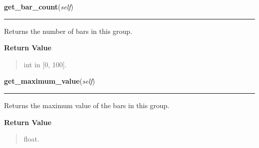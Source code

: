     \label{pygtk_chart:multi_bar_chart:BarGroup:get_bar_count}

    \vspace{0.5ex}

\hspace{.8\funcindent}\begin{boxedminipage}{\funcwidth}

    \raggedright \textbf{get\_bar\_count}(\textit{self})

    \vspace{-1.5ex}

    \rule{\textwidth}{0.5\fboxrule}
\setlength{\parskip}{2ex}
    Returns the number of bars in this group.

\setlength{\parskip}{1ex}
      \textbf{Return Value}
    \vspace{-1ex}

      \begin{quote}
      int in [0, 100].

      \end{quote}

    \end{boxedminipage}

    \label{pygtk_chart:multi_bar_chart:BarGroup:get_maximum_value}

    \vspace{0.5ex}

\hspace{.8\funcindent}\begin{boxedminipage}{\funcwidth}

    \raggedright \textbf{get\_maximum\_value}(\textit{self})

    \vspace{-1.5ex}

    \rule{\textwidth}{0.5\fboxrule}
\setlength{\parskip}{2ex}
    Returns the maximum value of the bars in this group.

\setlength{\parskip}{1ex}
      \textbf{Return Value}
    \vspace{-1ex}

      \begin{quote}
      float.

      \end{quote}

    \end{boxedminipage}

